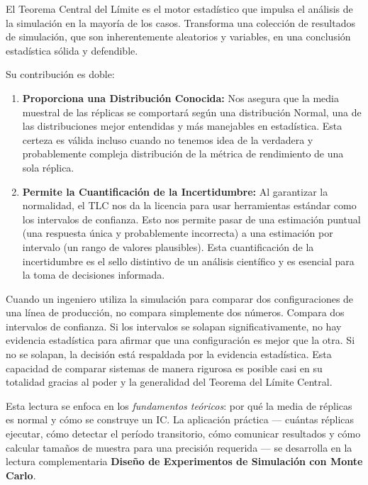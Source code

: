 \documentclass[11pt, letterpaper]{article}
\begin{document}
El Teorema Central del Límite es el motor estadístico que impulsa el análisis de la simulación en la mayoría de los casos. Transforma una colección de resultados de simulación, que son inherentemente aleatorios y variables, en una conclusión estadística sólida y defendible.

Su contribución es doble:
\begin{enumerate}
    \item \textbf{Proporciona una Distribución Conocida:} Nos asegura que la media muestral de las réplicas se comportará según una distribución Normal, una de las distribuciones mejor entendidas y más manejables en estadística. Esta certeza es válida incluso cuando no tenemos idea de la verdadera y probablemente compleja distribución de la métrica de rendimiento de una sola réplica.
    
    \item \textbf{Permite la Cuantificación de la Incertidumbre:} Al garantizar la normalidad, el TLC nos da la licencia para usar herramientas estándar como los intervalos de confianza. Esto nos permite pasar de una estimación puntual (una respuesta única y probablemente incorrecta) a una estimación por intervalo (un rango de valores plausibles). Esta cuantificación de la incertidumbre es el sello distintivo de un análisis científico y es esencial para la toma de decisiones informada.
\end{enumerate}

Cuando un ingeniero utiliza la simulación para comparar dos configuraciones de una línea de producción, no compara simplemente dos números. Compara dos intervalos de confianza. Si los intervalos se solapan significativamente, no hay evidencia estadística para afirmar que una configuración es mejor que la otra. Si no se solapan, la decisión está respaldada por la evidencia estadística. Esta capacidad de comparar sistemas de manera rigurosa es posible casi en su totalidad gracias al poder y la generalidad del Teorema del Límite Central.

\begin{notabox}
Esta lectura se enfoca en los \emph{fundamentos teóricos}: por qué la media de réplicas es normal y cómo se construye un IC. La aplicación práctica — cuántas réplicas ejecutar, cómo detectar el período transitorio, cómo comunicar resultados y cómo calcular tamaños de muestra para una precisión requerida — se desarrolla en la lectura complementaria \textbf{Diseño de Experimentos de Simulación con Monte Carlo}.
\end{notabox}
\end{document}
